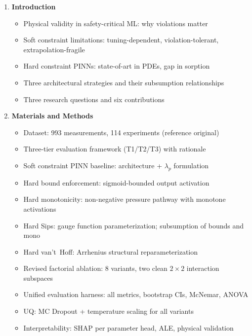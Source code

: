 \documentclass[12pt,a4paper]{article}
\begin{document}
\begin{enumerate}[label=\textbf{\arabic*.}]

\item \textbf{Introduction}
\begin{itemize}
  \item Physical validity in safety-critical ML: why violations matter
  \item Soft constraint limitations: tuning-dependent, violation-tolerant,
    extrapolation-fragile
  \item Hard constraint PINNs: state-of-art in PDEs, gap in sorption
  \item Three architectural strategies and their subsumption relationships
  \item Three research questions and six contributions
\end{itemize}

\item \textbf{Materials and Methods}
\begin{itemize}
  \item Dataset: 993 measurements, 114 experiments (reference original)
  \item Three-tier evaluation framework (T1/T2/T3) with rationale
  \item Soft constraint PINN baseline: architecture + $\lambda_p$ formulation
  \item Hard bound enforcement: sigmoid-bounded output activation
  \item Hard monotonicity: non-negative pressure pathway with monotone activations
  \item Hard Sips: gauge function parameterization; subsumption of bounds and mono
  \item Hard van't~Hoff: Arrhenius structural reparameterization
  \item Revised factorial ablation: 8 variants, two clean $2\times2$ interaction subspaces
  \item Unified evaluation harness: all metrics, bootstrap CIs, McNemar, ANOVA
  \item UQ: MC Dropout + temperature scaling for all variants
  \item Interpretability: SHAP per parameter head, ALE, physical validation
\end{itemize}


\end{enumerate}
\end{document}
